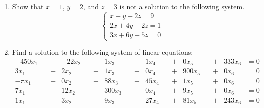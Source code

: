 \documentclass[basic]{inVerba-notes}
\begin{document}
\begin{enumerate}[align=left, leftmargin=0pt, labelindent=\parindent, listparindent=\parindent, labelwidth=0pt, itemindent=!]
\begin{enumerate}
  \end{enumerate}

  \newpage

  \item {} Show that \(x=1\), \(y=2\), and \(z=3\) is not a solution to the following system.
  \[%
  \begin{cases}
    x+y+2z=9\\
    2x+4y-2z=1\\
    3x+6y-5z=0
  \end{cases}
  \]%
  \vspace{-24pt}
  
  \item {} Find a solution to the following system of linear equations: 
  \begin{align*}
    -450x_1 & \quad + & -22x_2 & \quad + & 1x_3 & \quad + & 1x_4 & \quad + & 0x_5 & \quad + & 333x_6 &= 0 \\
    3x_1 & \quad + & 2x_2 & \quad + & 1x_3 & \quad + & 0x_4 & \quad + & 900x_5 & \quad + & 0x_6 &= 0 \\
    -\pi x_1 & \quad + & 0x_2 & \quad + & 88x_3 & \quad + & 45x_4 & \quad + & 1x_5 & \quad + & 0x_6 &= 0 \\
    7x_1 & \quad + & 12x_2 & \quad + & 300x_3 & \quad + & 0x_4 & \quad + & 9x_5 & \quad + & 0x_6 &= 0 \\
    1x_1 & \quad + & 3x_2 & \quad + & 9x_3 & \quad + & 27x_4 & \quad + & 81x_5 & \quad + & 243x_6 &= 0 
  \end{align*}
  
\end{enumerate}
\end{document}
